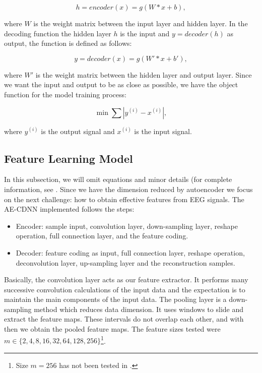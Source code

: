 \begin{equation}
h = encoder(x) = g(W*x+b),
\end{equation}

where $W$ is the weight matrix between the input layer and hidden layer. In the decoding function the hidden layer $h$ is the input and $y = decoder(h)$ as output, the function is defined as follows:

\begin{equation}
y = decoder(x) = g(W'*x + b'),
\end{equation}

where $W'$ is the weight matrix between the hidden layer and output layer. Since we want the input and output to be as close as possible, we have the object function for the model training process:

\begin{equation}
\min \sum |y^{(i)} - x^{(i)}|,
\end{equation}

where $y^{(i)}$ is the output signal and $x^{(i)}$ is the input signal.

\subsection{Feature Learning Model}

In this subsection, we will omit equations and minor details (for complete information, see \cite{Shoeb,emami2019autoencoding}. Since we have the dimension reduced by autoencoder we focus on the next challenge: how to obtain effective features from EEG signals. The AE-CDNN implemented follows the steps:

\begin{itemize}
\item Encoder: sample input, convolution layer, down-sampling layer, reshape operation, full connection layer, and the feature coding.
\item Decoder: feature coding as input, full 
connection layer, reshape operation, deconvolution layer, up-sampling layer and the reconstruction samples.
\end{itemize}

Basically, the convolution layer acts as our feature extractor. It performs many successive convolution calculations of the input data and the expectation is to maintain the main components of the input data. The pooling layer is a down-sampling method which reduces data dimension. It uses windows to slide and extract the feature maps. These intervals do not overlap each other, and with then we obtain the pooled feature maps. The feature sizes tested were $m \in \{2, 4, 8, 16, 32, 64, 128, 256\}$\footnote{Size $m = 256$ has not been tested in \cite{WenZha:2018}.}.


